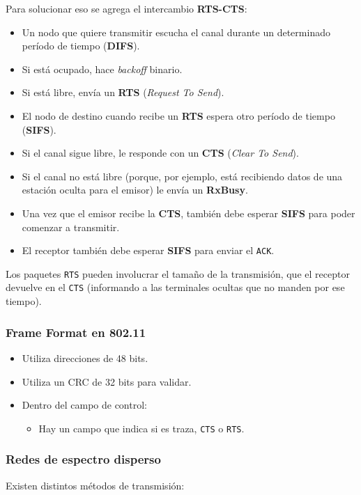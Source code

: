 \documentclass[]{article}
\begin{document}
Para solucionar eso se agrega el intercambio \textbf{RTS-CTS}:
\begin{itemize}
    \item Un nodo que quiere transmitir escucha el canal durante un determinado período de tiempo (\textbf{DIFS}).
    \item Si está ocupado, hace \emph{backoff} binario.
    \item Si está libre, envía un \textbf{RTS} (\emph{Request To Send}).
    \item El nodo de destino cuando recibe un \textbf{RTS} espera otro período de tiempo (\textbf{SIFS}).
    \item Si el canal sigue libre, le responde con un \textbf{CTS} (\emph{Clear To Send}).
    \item Si el canal no está libre (porque, por ejemplo, está recibiendo datos de una estación oculta para el emisor) le envía un \textbf{RxBusy}.
    \item Una vez que el emisor recibe la \textbf{CTS}, también debe esperar \textbf{SIFS} para poder comenzar a transmitir.
    \item El receptor también debe esperar \textbf{SIFS} para enviar el \texttt{ACK}.
\end{itemize}

Los paquetes \texttt{RTS} pueden involucrar el tamaño de la transmisión, que el receptor devuelve en el \texttt{CTS} (informando a las terminales ocultas que no manden por ese tiempo).

\subsubsection{Frame Format en 802.11}

\begin{itemize}
    \item Utiliza direcciones de 48 bits.
    \item Utiliza un CRC de 32 bits para validar.
    \item Dentro del campo de control:
    \begin{itemize}
        \item Hay un campo que indica si es traza, \texttt{CTS} o \texttt{RTS}.
    \end{itemize}
\end{itemize}

\subsubsection{Redes de espectro disperso}
Existen distintos métodos de transmisión:
\end{document}
